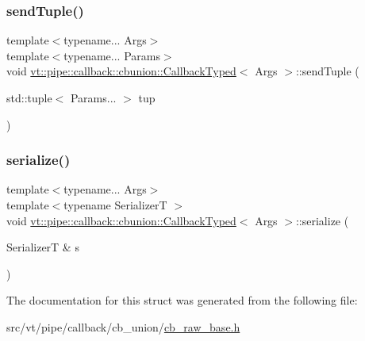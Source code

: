 \mbox{\label{structvt_1_1pipe_1_1callback_1_1cbunion_1_1_callback_typed_a6214b3bfdc8eba01bdfff2afb98bcf67}} 
\subsubsection{\texorpdfstring{send\+Tuple()}{sendTuple()}}
{\footnotesize\ttfamily template$<$typename... Args$>$ \\
template$<$typename... Params$>$ \\
void \hyperlink{structvt_1_1pipe_1_1callback_1_1cbunion_1_1_callback_typed}{vt\+::pipe\+::callback\+::cbunion\+::\+Callback\+Typed}$<$ Args $>$\+::send\+Tuple (\begin{DoxyParamCaption}\item[{std\+::tuple$<$ Params... $>$}]{tup }\end{DoxyParamCaption})\hspace{0.3cm}{\ttfamily [inline]}}

\mbox{\label{structvt_1_1pipe_1_1callback_1_1cbunion_1_1_callback_typed_af8158d7a51fd77c604849970aecc3780}} 
\subsubsection{\texorpdfstring{serialize()}{serialize()}}
{\footnotesize\ttfamily template$<$typename... Args$>$ \\
template$<$typename SerializerT $>$ \\
void \hyperlink{structvt_1_1pipe_1_1callback_1_1cbunion_1_1_callback_typed}{vt\+::pipe\+::callback\+::cbunion\+::\+Callback\+Typed}$<$ Args $>$\+::serialize (\begin{DoxyParamCaption}\item[{SerializerT \&}]{s }\end{DoxyParamCaption})\hspace{0.3cm}{\ttfamily [inline]}}



The documentation for this struct was generated from the following file\+:\begin{DoxyCompactItemize}
\item 
src/vt/pipe/callback/cb\+\_\+union/\hyperlink{cb__raw__base_8h}{cb\+\_\+raw\+\_\+base.\+h}\end{DoxyCompactItemize}
